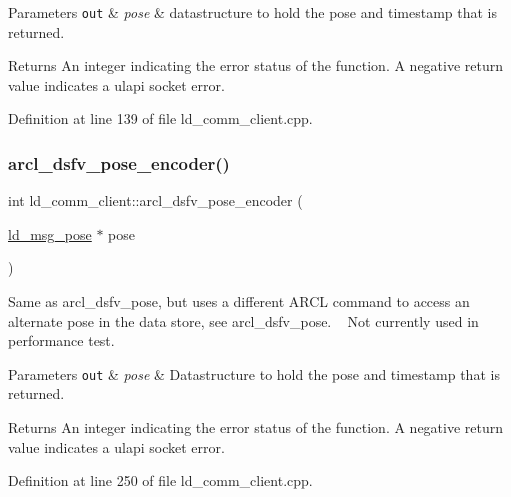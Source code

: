 \begin{DoxyParams}[1]{Parameters}
\mbox{\tt out}  & {\em pose} & datastructure to hold the pose and timestamp that is returned. \\
\hline
\end{DoxyParams}
\begin{DoxyReturn}{Returns}
An integer indicating the error status of the function. A negative return value indicates a ulapi socket error. 
\end{DoxyReturn}


Definition at line 139 of file ld\+\_\+comm\+\_\+client.\+cpp.

\mbox{\label{classld__comm__client_a8fe145161e824738ccd351c5533b9d1e}} 
\subsubsection{\texorpdfstring{arcl\+\_\+dsfv\+\_\+pose\+\_\+encoder()}{arcl\_dsfv\_pose\_encoder()}}
{\footnotesize\ttfamily int ld\+\_\+comm\+\_\+client\+::arcl\+\_\+dsfv\+\_\+pose\+\_\+encoder (\begin{DoxyParamCaption}\item[{\mbox{\hyperlink{structld__msg__pose}{ld\+\_\+msg\+\_\+pose}} $\ast$}]{pose }\end{DoxyParamCaption})}

Same as arcl\+\_\+dsfv\+\_\+pose, but uses a different A\+R\+CL command to access an alternate pose in the data store, see arcl\+\_\+dsfv\+\_\+pose. ~\newline
Not currently used in performance test. 
\begin{DoxyParams}[1]{Parameters}
\mbox{\tt out}  & {\em pose} & Datastructure to hold the pose and timestamp that is returned. \\
\hline
\end{DoxyParams}
\begin{DoxyReturn}{Returns}
An integer indicating the error status of the function. A negative return value indicates a ulapi socket error. 
\end{DoxyReturn}


Definition at line 250 of file ld\+\_\+comm\+\_\+client.\+cpp.

